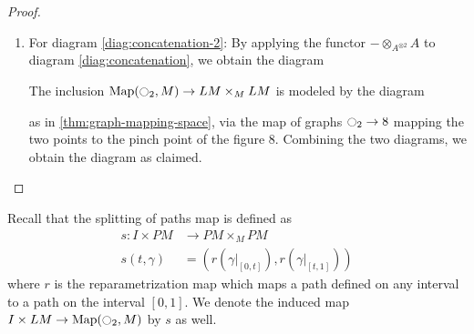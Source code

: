 \documentclass{scrartcl}
\theoremstyle{plain}
\theoremstyle{definition}
\newtheorem{remark}[theorem]{Remark}
\newcommand{\R}{\mathbb R}
\newcommand{\Z}{\mathbb Z}
\DeclareMathOperator{\Map}{Map}
\newcommand{\blank}{-}
\begin{document}
\begin{proof}
\begin{enumerate}
    \item For diagram \ref{diag:concatenation-2}: By applying the functor $\blank \otimes_{A^{\otimes 2}} A$ to diagram \ref{diag:concatenation}, we obtain the diagram
    \begin{center}
    \end{center}
    The inclusion $\Map(\ocircle_2, M)\to LM\times_M LM$ is modeled by the diagram
    \begin{center}
    \end{center}
    as in \ref{thm:graph-mapping-space}, via the map of graphs $\ocircle_2\to 8$ mapping the two points to the pinch point of the figure $8$. Combining the two diagrams, we obtain the diagram as claimed.
\end{enumerate}
\end{proof}

Recall that the splitting of paths map is defined as
\begin{align*} 
    s\colon I\times PM &\to PM\times_M PM\\
    s(t, \gamma)&=\left(r(\gamma|_{[0, t]}) , r(\gamma|_{[t, 1]})\right)
\end{align*}
where $r$ is the reparametrization map which maps a path defined on any interval to a path on the interval $[0,1]$. We denote the induced map $I\times LM\to \Map(\ocircle_2, M)$ by $s$ as well.

\end{document}
